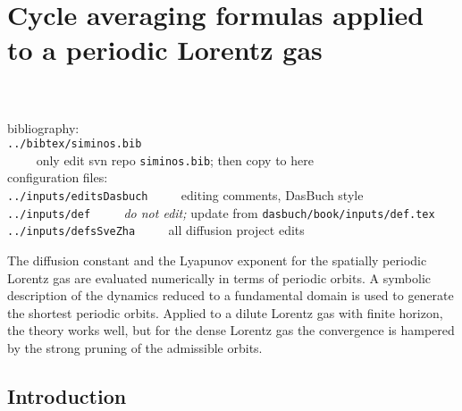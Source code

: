 

				\chapter{
Cycle averaging formulas applied to a periodic Lorentz gas
				}
\label{c-clipsSchreiber}

\ifboyscout
{}
\\
\\
bibliography:
\\
\texttt{../bibtex/siminos.bib}
\\$\qquad$ only edit svn repo \texttt{siminos.bib};
            then copy to here
\\
configuration files:
\\
\texttt{../inputs/editsDasbuch}   $\qquad$ editing comments, DasBuch style\\
\texttt{../inputs/def}            $\qquad$ \emph{do not edit;}
            update from \texttt{dasbuch/book/inputs/def.tex}\\
\texttt{../inputs/defsSveZha}     $\qquad$ all diffusion project edits


\bigskip\bigskip
The diffusion constant and the Lyapunov exponent
for the spatially periodic Lorentz gas are evaluated
numerically in terms of periodic orbits.
A symbolic description of the dynamics reduced to a fundamental domain is
used to generate the shortest periodic orbits.
Applied to a dilute Lorentz gas with finite horizon, the
theory works well, but for the dense Lorentz gas the convergence
is hampered by the strong pruning of the admissible orbits.

\fi

\section{Introduction}


